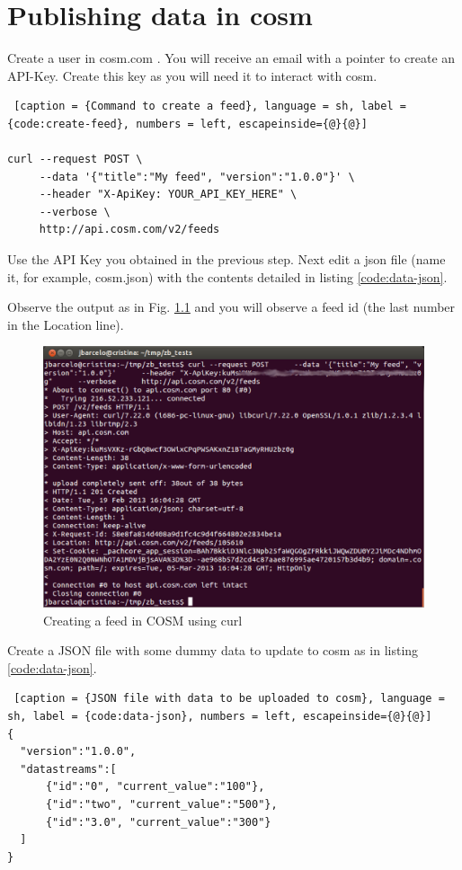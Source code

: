 \chapter{Publishing data in cosm}

Create a user in cosm.com .
You will receive an email with a pointer to create an API-Key.
Create this key as you will need it to interact with cosm.

\begin{lstlisting} [caption = {Command to create a feed}, language = sh, label = {code:create-feed}, numbers = left, escapeinside={@}{@}]

curl --request POST \
     --data '{"title":"My feed", "version":"1.0.0"}' \
     --header "X-ApiKey: YOUR_API_KEY_HERE" \
     --verbose \
     http://api.cosm.com/v2/feeds

\end{lstlisting}

Use the API Key you obtained in the previous step.
Next edit a json file (name it, for example, cosm.json) with the contents detailed in listing \ref{code:data-json}.

Observe the output as in Fig. \ref{fig:create-feed} and you will observe a feed id (the last number in the Location line).

\begin{figure}[htbp]
  \centering
  \includegraphics[width=0.9\linewidth]{figures/create-feed.eps}
  \caption{Creating a feed in COSM using curl}
  \label{fig:create-feed}
\end{figure}

Create a JSON file with some dummy data to update to cosm as in listing \ref{code:data-json}.

\begin{lstlisting} [caption = {JSON file with data to be uploaded to cosm}, language = sh, label = {code:data-json}, numbers = left, escapeinside={@}{@}]
{
  "version":"1.0.0",
  "datastreams":[
      {"id":"0", "current_value":"100"},
      {"id":"two", "current_value":"500"},
      {"id":"3.0", "current_value":"300"}
  ]
}
\end{lstlisting}


